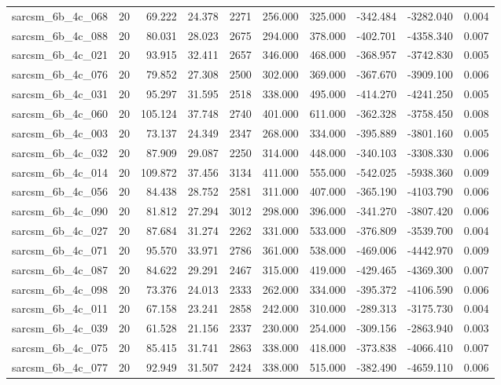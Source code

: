 \begin{tabular}{lrrrrrrrrr}
sarcsm\_6b\_4c\_068 & 20 & 69.222 & 24.378 & 2271 & 256.000 & 325.000 & -342.484 & -3282.040 & 0.004 \\
sarcsm\_6b\_4c\_088 & 20 & 80.031 & 28.023 & 2675 & 294.000 & 378.000 & -402.701 & -4358.340 & 0.007 \\
sarcsm\_6b\_4c\_021 & 20 & 93.915 & 32.411 & 2657 & 346.000 & 468.000 & -368.957 & -3742.830 & 0.005 \\
sarcsm\_6b\_4c\_076 & 20 & 79.852 & 27.308 & 2500 & 302.000 & 369.000 & -367.670 & -3909.100 & 0.006 \\
sarcsm\_6b\_4c\_031 & 20 & 95.297 & 31.595 & 2518 & 338.000 & 495.000 & -414.270 & -4241.250 & 0.005 \\
sarcsm\_6b\_4c\_060 & 20 & 105.124 & 37.748 & 2740 & 401.000 & 611.000 & -362.328 & -3758.450 & 0.008 \\
sarcsm\_6b\_4c\_003 & 20 & 73.137 & 24.349 & 2347 & 268.000 & 334.000 & -395.889 & -3801.160 & 0.005 \\
sarcsm\_6b\_4c\_032 & 20 & 87.909 & 29.087 & 2250 & 314.000 & 448.000 & -340.103 & -3308.330 & 0.006 \\
sarcsm\_6b\_4c\_014 & 20 & 109.872 & 37.456 & 3134 & 411.000 & 555.000 & -542.025 & -5938.360 & 0.009 \\
sarcsm\_6b\_4c\_056 & 20 & 84.438 & 28.752 & 2581 & 311.000 & 407.000 & -365.190 & -4103.790 & 0.006 \\
sarcsm\_6b\_4c\_090 & 20 & 81.812 & 27.294 & 3012 & 298.000 & 396.000 & -341.270 & -3807.420 & 0.006 \\
sarcsm\_6b\_4c\_027 & 20 & 87.684 & 31.274 & 2262 & 331.000 & 533.000 & -376.809 & -3539.700 & 0.004 \\
sarcsm\_6b\_4c\_071 & 20 & 95.570 & 33.971 & 2786 & 361.000 & 538.000 & -469.006 & -4442.970 & 0.009 \\
sarcsm\_6b\_4c\_087 & 20 & 84.622 & 29.291 & 2467 & 315.000 & 419.000 & -429.465 & -4369.300 & 0.007 \\
sarcsm\_6b\_4c\_098 & 20 & 73.376 & 24.013 & 2333 & 262.000 & 334.000 & -395.372 & -4106.590 & 0.006 \\
sarcsm\_6b\_4c\_011 & 20 & 67.158 & 23.241 & 2858 & 242.000 & 310.000 & -289.313 & -3175.730 & 0.004 \\
sarcsm\_6b\_4c\_039 & 20 & 61.528 & 21.156 & 2337 & 230.000 & 254.000 & -309.156 & -2863.940 & 0.003 \\
sarcsm\_6b\_4c\_075 & 20 & 85.415 & 31.741 & 2863 & 338.000 & 418.000 & -373.838 & -4066.410 & 0.007 \\
sarcsm\_6b\_4c\_077 & 20 & 92.949 & 31.507 & 2424 & 338.000 & 515.000 & -382.490 & -4659.110 & 0.006 \\

\end{tabular}
